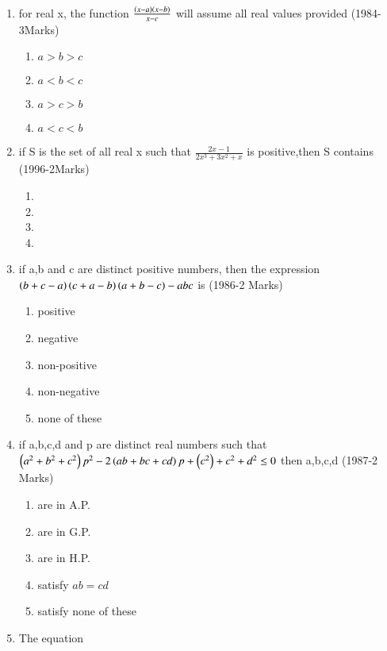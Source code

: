 \documentclass[journal,12pt,twocolumn]{IEEEtran}
\theoremstyle{remark}
\begin{document}
\begin{enumerate}
\item for real x, the function $\frac{\left(x-a\right)\left(x-b\right)}{x-c}$ will assume all real values provided \hfill (1984-3Marks)
\begin{multicols}{2}
\begin{enumerate}
    \item $a>b>c$
    \item $a<b<c$
    \item $a>c>b$
    \item $a<c<b$
\end{enumerate}
    
\end{multicols}
\item if S is the set of all real x such that $\frac{2x-1}{2x^{3}+3x^{2}+x}$ is positive,then S contains \hfill (1996-2Marks)
\begin{multicols}{2}
\begin{enumerate}
    \item {}
    \item {}
    \item {}
    \item {}
\end{enumerate}
    
\end{multicols}
\item if a,b and c are distinct positive numbers, then the expression $\left(b+c-a\right)\left(c+a-b\right)\left(a+b-c\right)-abc$ is \hfill (1986-2 Marks)
\begin{enumerate}
    \item positive
    \item negative
    \item non-positive
    \item non-negative
    \item none of these
\end{enumerate}
\item if a,b,c,d and p are distinct real numbers such that $\left(a^{2}+b^{2}+c^{2}\right)p^{2}-2\left(ab+bc+cd\right)p+\left(c^{2}\right)+c^{2}+d^{2}\leq 0$ then a,b,c,d \hfill (1987-2 Marks)
\begin{enumerate}
    \item are in A.P.
    \item are in G.P.
    \item are in H.P.
    \item satisfy $ab=cd$
    \item satisfy none of these
\end{enumerate}
\item The equation


\end{enumerate}
\end{document}
